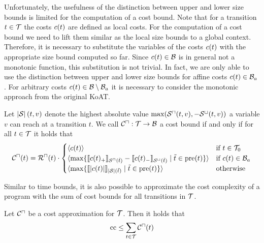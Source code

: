 Unfortunately, the usefulness of the distinction between upper and lower size bounds is limited for the computation of a cost bound.
Note that for a transition $t \in \mathcal{T}$ the costs $c(t)$ are defined as local costs.
For the computation of a cost bound we need to lift them similar as the local size bounds to a global context.
Therefore, it is necessary to substitute the variables of the costs $c(t)$ with the appropriate size bound computed so far.
Since $c(t) \in \mathcal{B}$ is in general not a monotonic function, this substitution is not trivial.
In fact, we are only able to use the distinction between upper and lower size bounds for affine costs $c(t) \in \mathcal{B}_a$.
For arbitrary costs $c(t) \in \mathcal{B} \setminus \mathcal{B}_a$ it is necessary to consider the monotonic approach from the original KoAT.

\begin{definition}
  Let $\left|\mathcal{S}\right|(t, v)$ denote the highest absolute value $\max({\mathcal{S}^\sqcap}(t, v), -{\mathcal{S}^\sqcup}(t, v))$ a variable $v$ can reach at a transition $t$.
  We call ${\mathcal{C}^\sqcap}: \mathcal{T} \rightarrow \mathcal{B}$ a cost bound if and only if for all $t \in \mathcal{T}$ it holds that
  \[ {\mathcal{C}^\sqcap}(t) = {\mathcal{R}^\sqcap}(t) \cdot
  \begin{cases}
    \langle c(t)\rangle & \text{if } t \in \mathcal{T}_0 \\
    \langle\max \lbrace \llbracket c(t)_+ \rrbracket_{{\mathcal{S}^\sqcap}(\tilde{t})} - \llbracket c(t)_- \rrbracket_{{\mathcal{S}^\sqcup}(\tilde{t})} \mid \tilde{t} \in \text{pre}(t) \rbrace\rangle & \text{if } c(t) \in \mathcal{B}_a \\
    \langle\max \lbrace \llbracket \left|c(t)\right| \rrbracket_{\left|\mathcal{S}\right|(\tilde{t})} \mid \tilde{t} \in \text{pre}(t) \rbrace\rangle & \text{otherwise} \\
  \end{cases}
  \]
\end{definition}

Similar to time bounds, it is also possible to approximate the cost complexity of a program with the sum of cost bounds for all transitions in $\mathcal{T}$.

\begin{theorem}
	Let ${\mathcal{C}^\sqcap}$ be a cost approximation for $\mathcal{T}$.
	Then it holds that 
	\[ \text{cc} \leq \sum_{t \in \mathcal{T}} {\mathcal{C}^\sqcap}(t) \]
\end{theorem}

